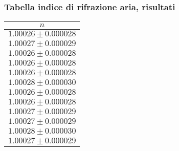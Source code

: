 \subsubsection{Tabella indice di rifrazione aria, risultati}
    \begin{table}[H]
    \centering
        \begin{tabular}{|c|}
        \hline
        $ n $ \\
        \hline
        $ 1.00026 \pm 0.000028 $ \\
        \hline
        $ 1.00027 \pm 0.000029 $ \\
        \hline
        $ 1.00026 \pm 0.000028 $ \\
        \hline
        $ 1.00026 \pm 0.000028 $ \\
        \hline
        $ 1.00026 \pm 0.000028 $ \\
        \hline
        $ 1.00028 \pm 0.000030 $ \\
        \hline
        $ 1.00026 \pm 0.000028 $ \\
        \hline
        $ 1.00026 \pm 0.000028 $ \\
        \hline
        $ 1.00027 \pm 0.000029 $ \\
        \hline
        $ 1.00027 \pm 0.000029 $ \\
        \hline
        $ 1.00028 \pm 0.000030 $ \\
        \hline
        $ 1.00027 \pm 0.000029 $ \\
        \hline
        \end{tabular}
    \end{table}
